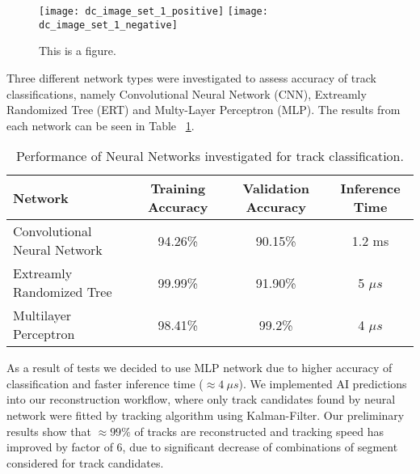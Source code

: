 \documentclass[11pt]{revtex4}
\begin{document}
\begin{figure}[htb]
\begin{center}
\texttt{[image: dc\_image\_set\_1\_positive]}
\texttt{[image: dc\_image\_set\_1\_negative]}
\caption{This is a figure.}
\end{center}
\end{figure}

Three different network types were investigated to assess accuracy of track classifications,
namely Convolutional Neural Network (CNN), Extreamly Randomized Tree (ERT) and
Multy-Layer Perceptron (MLP). The results from each network can be seen in
Table ~\ref{tbl:RESULTS}.

\begin{table}[!h]
\begin{tabular}{|l|c|c|c|}
\hline
Network & Training Accuracy & Validation Accuracy & Inference Time \\
\hline
\hline
Convolutional Neural Network & 94.26\% & 90.15\% & 1.2 ms \\
Extreamly Randomized Tree & 99.99\% & 91.90\% & 5  $\mu s$ \\
Multilayer Perceptron & 98.41\% & 99.2\% & 4  $\mu s$ \\
\hline
\end{tabular}
\caption{Performance of Neural Networks investigated for track classification.}
\label{tbl:RESULTS}
\end{table}

As a result of tests we decided to use MLP network due to higher accuracy of classification
and faster inference time ($\approx 4 ~\mu s$). We implemented AI predictions into our
reconstruction workflow, where only track candidates found by neural network were fitted
by tracking algorithm using Kalman-Filter. Our preliminary results show that $\approx 99\%$
of tracks are reconstructed and tracking speed has improved by factor of 6, due to significant
decrease of combinations of segment considered for track candidates.
\end{document}
